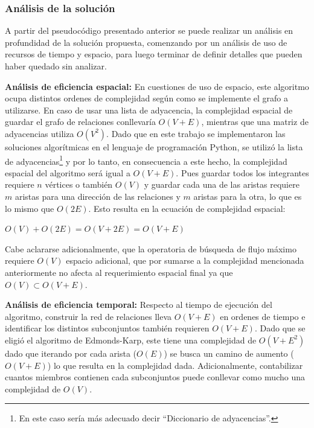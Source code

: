\documentclass[12pt]{article}
\begin{document}
        \subsubsection{Análisis de la solución}

            A partir del pseudocódigo presentado anterior se puede realizar un análisis en profundidad de la solución propuesta, comenzando por un análisis de uso de recursos de tiempo y espacio, para luego terminar de definir detalles que pueden haber quedado sin analizar.

            \textbf{Análisis de eficiencia espacial:} En cuestiones de uso de espacio, este algoritmo ocupa distintos ordenes de complejidad según como se implemente el grafo a utilizarse. En caso de usar una lista de adyacencia, la complejidad espacial de guardar el grafo de relaciones conllevaría $O(V+E)$, mientras que una matriz de adyacencias utiliza $O(V^2)$. Dado que en este trabajo se implementaron las soluciones algorítmicas en el lenguaje de programación Python, se utilizó la lista de adyacencias\footnote{En este caso sería más adecuado decir ``Diccionario de adyacencias''.} y por lo tanto, en consecuencia a este hecho, la complejidad espacial del algoritmo será igual a $O(V+E)$. Pues guardar todos los integrantes requiere $n$ vértices o también $O(V)$ y guardar cada una de las aristas requiere $m$ aristas para una dirección de las relaciones y $m$ aristas para la otra, lo que es lo mismo que $O(2E)$. Esto resulta en la ecuación de complejidad espacial: 
            \begin{center}
                $O(V) + O(2E) = O(V+2E) = O(V+E)$
            \end{center}

            Cabe aclararse adicionalmente, que la operatoria de búsqueda de flujo máximo requiere $O(V)$ espacio adicional, que por sumarse a la complejidad mencionada anteriormente no afecta al requerimiento espacial final ya que $O(V) \subset O(V+E)$.
            
            \textbf{Análisis de eficiencia temporal:} Respecto al tiempo de ejecución del algoritmo, construir la red de relaciones lleva $O(V+E)$ en ordenes de tiempo e identificar los distintos subconjuntos también requieren $O(V+E)$. Dado que se eligió el algoritmo de Edmonds-Karp, este tiene una complejidad de $O(V+E^{2})$ dado que iterando por cada arista ($O(E)$) se busca un camino de aumento ($O(V+E)$) lo que resulta en la complejidad dada. Adicionalmente, contabilizar cuantos miembros contienen cada subconjuntos puede conllevar como mucho una complejidad de $O(V)$. 
            
\end{document}
